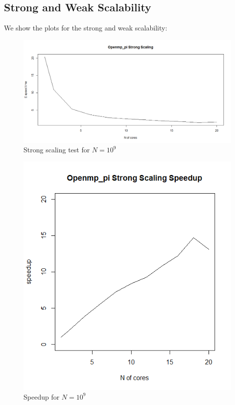 \documentclass{article}
\begin{document}
\subsection{Strong and Weak Scalability}
We show the plots for the strong and weak scalability:


\begin{figure}[H] %
	\centering
	\includegraphics[width=0.8\columnwidth]{graphs/openmp_pi_strongscaling} %
	\caption{Strong scaling test for $N=10^9$}
\end{figure}

\begin{figure}[H] %
	\centering
	\includegraphics[width=0.8\columnwidth]{graphs/openmp_pi_strongscaling_speedup} %
	\caption{Speedup for $N=10^9$}
\end{figure}
\end{document}
